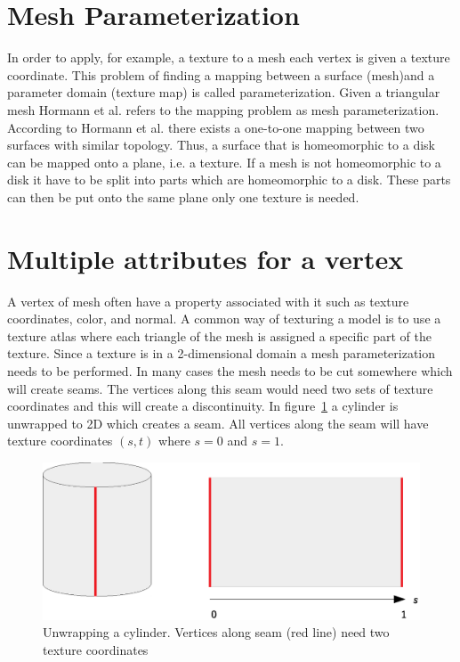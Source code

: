 \section{Mesh Parameterization} \label{sec:mesh_parametrization}
In order to apply, for example, a texture to a mesh each vertex is given a texture coordinate. This problem of finding a mapping between a surface (mesh)and a parameter domain (texture map) is called parameterization. Given a triangular mesh Hormann et al. \cite{hormann2007mesh} refers to the mapping problem as mesh parameterization. According to Hormann et al. there exists a one-to-one mapping between two surfaces with similar topology. Thus, a surface that is homeomorphic to a disk can be mapped onto a plane, i.e. a texture. If a mesh is not homeomorphic to a disk it have to be split into parts which are homeomorphic to a disk. These parts can then be put onto the same plane only one texture is needed.


\section{Multiple attributes for a vertex} \label{sec:vertex-with-}
A vertex of mesh often have a property associated with it such as texture coordinates, color, and normal. A common way of texturing a model is to use a texture atlas where each triangle of the mesh is assigned a specific part of the texture. Since a texture is in a 2-dimensional domain a mesh parameterization needs to be performed. In many cases the mesh needs to be cut somewhere which will create seams. The vertices along this seam would need two sets of texture coordinates and this will create a discontinuity. In figure~\ref{fig:cylinder_unwrap} a cylinder is unwrapped to 2D which creates a seam. All vertices along the seam will have texture coordinates $(s,t)$ where $s=0$ and $s=1$.

\begin{figure}[h]
    \centering
    \includegraphics[width=\textwidth]{figures/cylinder_unwrap.eps}
    \caption{Unwrapping a cylinder. Vertices along seam (red line) need two texture coordinates}
    \label{fig:cylinder_unwrap}
\end{figure}

